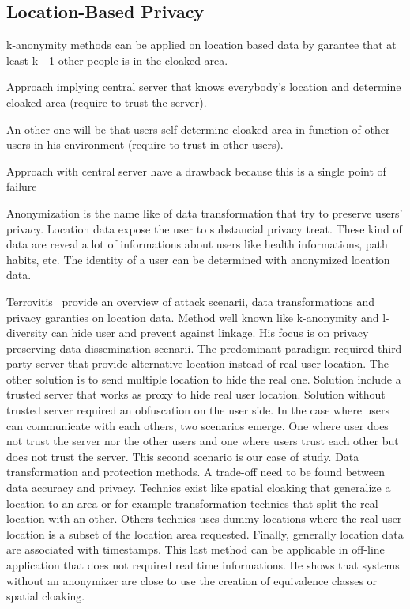 \subsection{Location-Based Privacy}


k-anonymity methods can be applied on location based data by garantee that at least k - 1 other people is in the cloaked area.

Approach implying central server that knows everybody's location and determine cloaked area (require to trust the server).

An other one will be that users self determine cloaked area in function of other users in his environment (require to trust in other users).

Approach with central server have a drawback because this is a single point of failure

Anonymization is the name like of data transformation that try to preserve users' privacy.
Location data expose the user to substancial privacy treat.
These kind of data are reveal a lot of informations about users like health informations, path habits, etc.
The identity of a user can be determined with anonymized location data.

Terrovitis~\cite{DBLP:journals/sigkdd/Terrovitis11} provide an overview of attack scenarii, data transformations and privacy garanties on location data.
Method well known like k-anonymity and l-diversity can hide user and prevent against linkage.
His focus is on privacy preserving data dissemination scenarii.
The predominant paradigm required third party server that provide alternative location instead of real user location.
The other solution is to send multiple location to hide the real one.
Solution include a trusted server that works as proxy to hide real user location.
Solution without trusted server required an obfuscation on the user side.
In the case where users can communicate with each others, two scenarios emerge. One where user does not trust the server nor the other users and one where users trust each other but does not trust the server.
This second scenario is our case of study.
Data transformation and protection methods. 
A trade-off need to be found between data accuracy and privacy.
Technics exist like spatial cloaking that generalize a location to an area or for example transformation technics that split the real location with an other.
Others technics uses dummy locations where the real user location is a subset of the location area requested.
Finally, generally location data are associated with timestamps.
This last method can be applicable in off-line application that does not required real time informations.
He shows that systems without an anonymizer are close to use the creation of equivalence classes or spatial cloaking.

